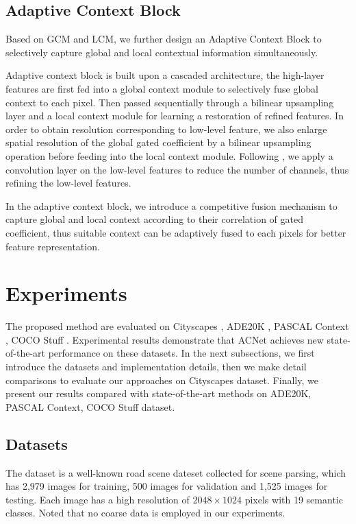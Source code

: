 \documentclass[10pt,twocolumn,letterpaper]{article}
\begin{document}
\subsection{Adaptive Context Block}
Based on GCM and LCM, we further design an Adaptive Context Block to  selectively  capture global and local contextual information simultaneously.

Adaptive context block is built upon a cascaded architecture, the  high-layer features are first fed into  a global context module to  selectively fuse global context to each pixel. 
Then  passed sequentially through a bilinear upsampling layer and   a local context module for learning a restoration of refined features. In order to obtain resolution corresponding to low-level feature, we also enlarge spatial resolution of the global gated coefficient by a bilinear upsampling operation before feeding into the local context module. Following \cite{chen2018encoder}, we apply a convolution layer on the low-level features to reduce the number of channels, thus refining the  low-level features. 

In the adaptive context block, we introduce a competitive fusion mechanism to capture global and local  context  according to their correlation of gated coefficient, thus suitable context can be adaptively fused to each pixels for better feature representation.


\section{Experiments}
The proposed method are evaluated on Cityscapes \cite{cityscapes}, ADE20K \cite{zhou2017scene}, PASCAL Context \cite{pcontext}, COCO Stuff \cite{caesar2018coco}.
Experimental results demonstrate that ACNet achieves new state-of-the-art performance on these  datasets. 
 In the next subsections,  we first introduce the datasets and  implementation details, then we make detail comparisons to evaluate our approaches on Cityscapes dataset. Finally, we present our  results  compared with state-of-the-art methods on ADE20K, PASCAL Context, COCO Stuff dataset.

\subsection{Datasets}
 The dataset is a well-known road scene dateset collected for scene parsing, which
 has  2,979 images for training, 500 images  for validation and 1,525 images for testing. 
Each image has a high resolution of ${2048\times1024}$ pixels with 19 semantic classes. Noted that no coarse data is employed  in our experiments.
 
\end{document}
